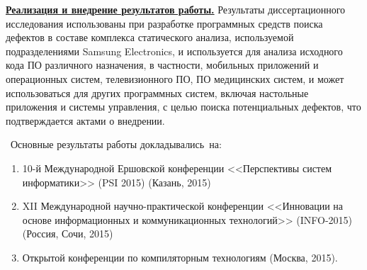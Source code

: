 
\underline{\textbf{Реализация и внедрение результатов работы.}} Результаты диссертационного исследования использованы при разработке программных средств поиска дефектов в составе комплекса статического анализа, используемой подразделениями Samsung Electronics, и используется для анализа исходного кода ПО различного назначения, в частности, мобильных приложений и операционных систем, телевизионного ПО, ПО медицинских систем, и может использоваться для других программных систем, включая настольные приложения и системы управления, с целью поиска потенциальных дефектов, что подтверждается актами о внедрении.

\probation\
Основные результаты работы докладывались~на:
\begin{enumerate}[leftmargin=1em]
 \item 10-й Международной Ершовской конференции <<Перспективы систем информатики>> (PSI 2015) (Казань, 2015)
 \item XII Международной научно-практической конференции <<Инновации на основе информационных и коммуникационных технологий>> (INFO-2015) (Россия, Сочи, 2015)
 \item Открытой конференции по компиляторным технологиям (Москва, 2015).
\end{enumerate}


